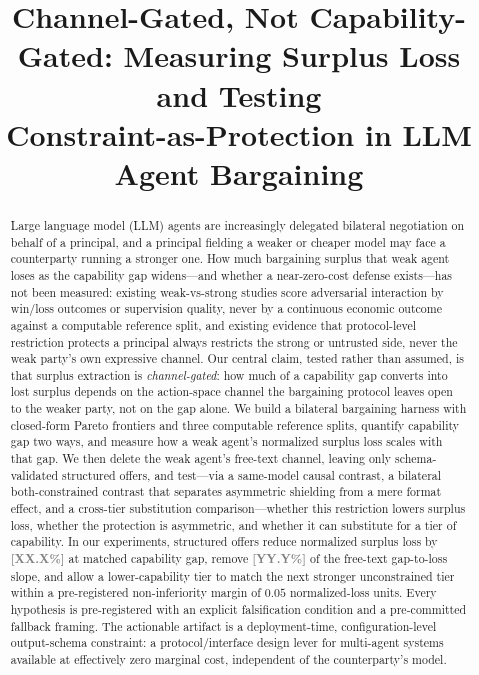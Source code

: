 \documentclass[conference]{IEEEtran}
\newcommand{\ph}[1]{\textcolor{Gray}{\textbf{[#1]}}}
\begin{document}
\title{Channel-Gated, Not Capability-Gated: Measuring Surplus Loss and Testing\\ Constraint-as-Protection in LLM Agent Bargaining}

\author{
}

\maketitle

\begin{abstract}
Large language model (LLM) agents are increasingly delegated bilateral negotiation on behalf of a principal, and a principal fielding a weaker or cheaper model may face a counterparty running a stronger one. How much bargaining surplus that weak agent loses as the capability gap widens---and whether a near-zero-cost defense exists---has not been measured: existing weak-vs-strong studies score adversarial interaction by win/loss outcomes or supervision quality, never by a continuous economic outcome against a computable reference split, and existing evidence that protocol-level restriction protects a principal always restricts the strong or untrusted side, never the weak party's own expressive channel. Our central claim, tested rather than assumed, is that surplus extraction is \emph{channel-gated}: how much of a capability gap converts into lost surplus depends on the action-space channel the bargaining protocol leaves open to the weaker party, not on the gap alone. We build a bilateral bargaining harness with closed-form Pareto frontiers and three computable reference splits, quantify capability gap two ways, and measure how a weak agent's normalized surplus loss scales with that gap. We then delete the weak agent's free-text channel, leaving only schema-validated structured offers, and test---via a same-model causal contrast, a bilateral both-constrained contrast that separates asymmetric shielding from a mere format effect, and a cross-tier substitution comparison---whether this restriction lowers surplus loss, whether the protection is asymmetric, and whether it can substitute for a tier of capability. In our experiments, structured offers reduce normalized surplus loss by \ph{XX.X\%} at matched capability gap, remove \ph{YY.Y\%} of the free-text gap-to-loss slope, and allow a lower-capability tier to match the next stronger unconstrained tier within a pre-registered non-inferiority margin of $0.05$ normalized-loss units. Every hypothesis is pre-registered with an explicit falsification condition and a pre-committed fallback framing. The actionable artifact is a deployment-time, configuration-level output-schema constraint: a protocol/interface design lever for multi-agent systems available at effectively zero marginal cost, independent of the counterparty's model.
\end{abstract}
\end{document}

